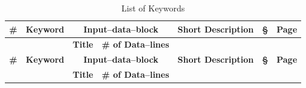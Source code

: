\documentclass[a4paper,11pt]{report}
\begin{document}
\begin{center}
\scriptsize
\begin{longtable}{|c|c|c|c|c|c|c|}

  \caption{List of Keywords}\\
  \hline 
  \rule[-4mm]{0mm}{10mm} {\bf \#} & {\bf Keyword} & \multicolumn{2}{c|}{\bf Input--data--block} & {\bf Short Description} & {\bf \S } & {\bf Page} \\
  \hline \rule[-3mm]{0mm}{8mm} & & {\bf Title} & {\bf \# of Data--lines} & & & \\
  \endfirsthead
  \hline 
  \rule[-4mm]{0mm}{10mm} {\bf \#} & {\bf Keyword} & \multicolumn{2}{c|}{\bf Input--data--block} & {\bf Short Description} & {\bf \S } & {\bf Page} \\
  \hline \rule[-3mm]{0mm}{8mm} & & {\bf Title} & {\bf \# of Data--lines} & & & \\
  \endhead



\end{longtable}
\end{center}
\end{document}

